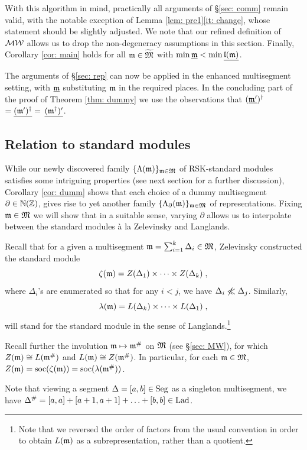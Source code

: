 \documentclass{ert-l} %
\begin{document}
With this algorithm in mind, practically all arguments of \S\ref{sec: comm} remain valid, with the notable exception of Lemma \ref{lem: pre1}\eqref{it: change},
whose statement should be slightly adjusted. We note that our refined definition of $\mathcal{MW}$ allows us to drop the non-degeneracy assumptions in this section.
Finally, Corollary \ref{cor: main} holds for all $\mathfrak{m}\in \widetilde{\mathfrak{M}}$ with $\min \underline{\mathfrak{m}} < \min \underline{\mathfrak{l}(\mathfrak{m})}$.

The arguments of \S\ref{sec: rep} can now be applied in the enhanced multisegment setting, with $\underline{\mathfrak{m}}$ substituting $\mathfrak{m}$ in the required places.
In the concluding part of the proof of Theorem \ref{thm: dummy} we use the observations that $(\underline{\mathfrak{m}'})^{\dagger}$
$ = \underline{(\mathfrak{m}')^{\dagger}} = $
$\underline{(\mathfrak{m}^{\dagger})'}$.



\subsection{Relation to standard modules}
While our newly discovered family $\{\Lambda(\mathfrak{m})\}_{\mathfrak{m}\in \mathfrak{M}}$ of RSK-standard modules satisfies some intriguing properties (see next section for a further discussion),
Corollary \ref{cor: dumm} shows that each choice of a dummy multisegment $\partial \in \mathbb{N}(\mathbb{Z})$, gives rise to yet another family $\{\Lambda_\partial(\mathfrak{m})\}_{\mathfrak{m}\in \mathfrak{M}}$ of representations.
Fixing $\mathfrak{m}\in\mathfrak{M}$ we will show that in a suitable sense, varying $\partial$ allows us to interpolate between the standard modules \`a la Zelevinsky and Langlands.

Recall that for a given a multisegment $\mathfrak{m}=\sum_{i=1}^k\Delta_i\in\mathfrak{M}$, Zelevinsky constructed the standard module
\[
\zeta(\mathfrak{m})= Z(\Delta_1)\times\dots\times Z(\Delta_k)\;,
\]
where $\Delta_i$'s are enumerated so that for any $i<j$, we have $\Delta_i\not\ll\Delta_j$. Similarly,
\[
\lambda(\mathfrak{m})= L(\Delta_k)\times\dots\times L(\Delta_1)\;,
\]
will stand for the standard module in the sense of Langlands.\footnote{Note that we reversed the order of factors from the usual convention
in order to obtain $L(\mathfrak{m})$ as a subrepresentation, rather than a quotient.}

Recall further the involution $\mathfrak{m}\mapsto \mathfrak{m}^\#$ on $\mathfrak{M}$ (see \S\ref{sec: MW}), for which $Z(\mathfrak{m}) \cong L(\mathfrak{m}^\#)$
and $L(\mathfrak{m})\cong Z(\mathfrak{m}^\#)$.
In particular, for each $\mathfrak{m}\in \mathfrak{M}$, $Z(\mathfrak{m})=\operatorname{soc}(\zeta(\mathfrak{m}))=\operatorname{soc}(\lambda(\mathfrak{m}^\#))$.

Note that viewing a segment $\Delta=[a,b]\in \operatorname{Seg}$ as a singleton multisegment, we have $\Delta^\# = [a,a] + [a+1,a+1] + \ldots+ [b,b]\in \operatorname{Lad}$.
\end{document}
